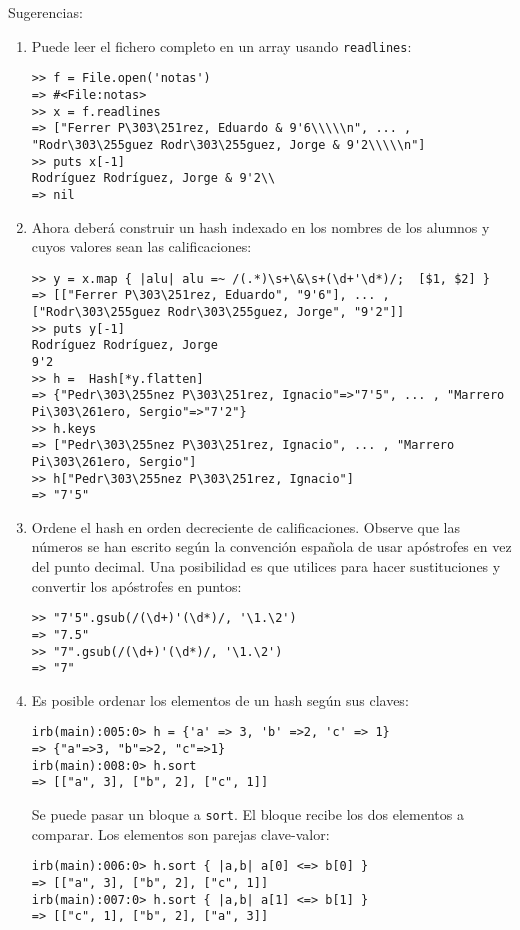 Sugerencias:

\begin{enumerate}
\item
Puede leer el fichero completo en un array usando \verb|readlines|:
\begin{verbatim}
>> f = File.open('notas')
=> #<File:notas>
>> x = f.readlines
=> ["Ferrer P\303\251rez, Eduardo & 9'6\\\\\n", ... , "Rodr\303\255guez Rodr\303\255guez, Jorge & 9'2\\\\\n"]
>> puts x[-1]
Rodríguez Rodríguez, Jorge & 9'2\\
=> nil
\end{verbatim}
\item
Ahora deberá construir un hash indexado
en los nombres de los alumnos y cuyos valores sean las calificaciones:
\begin{verbatim}
>> y = x.map { |alu| alu =~ /(.*)\s+\&\s+(\d+'\d*)/;  [$1, $2] }
=> [["Ferrer P\303\251rez, Eduardo", "9'6"], ... , ["Rodr\303\255guez Rodr\303\255guez, Jorge", "9'2"]]
>> puts y[-1]
Rodríguez Rodríguez, Jorge
9'2
>> h =  Hash[*y.flatten]
=> {"Pedr\303\255nez P\303\251rez, Ignacio"=>"7'5", ... , "Marrero Pi\303\261ero, Sergio"=>"7'2"}
>> h.keys
=> ["Pedr\303\255nez P\303\251rez, Ignacio", ... , "Marrero Pi\303\261ero, Sergio"]
>> h["Pedr\303\255nez P\303\251rez, Ignacio"]
=> "7'5"
\end{verbatim}
\item
Ordene el hash en orden decreciente de calificaciones.
Observe que las números se han escrito según la convención española de usar apóstrofes
en vez del punto decimal. Una posibilidad es que utilices 
para hacer sustituciones
y convertir los apóstrofes en puntos:
\begin{verbatim}
>> "7'5".gsub(/(\d+)'(\d*)/, '\1.\2')
=> "7.5"
>> "7".gsub(/(\d+)'(\d*)/, '\1.\2')
=> "7"
\end{verbatim}
\item
Es posible ordenar los elementos de un hash según sus claves:
\begin{verbatim}
irb(main):005:0> h = {'a' => 3, 'b' =>2, 'c' => 1}
=> {"a"=>3, "b"=>2, "c"=>1}
irb(main):008:0> h.sort
=> [["a", 3], ["b", 2], ["c", 1]]
\end{verbatim}
Se puede pasar un bloque a \verb|sort|. El bloque recibe los dos elementos
a comparar. Los elementos son parejas clave-valor:
\begin{verbatim}
irb(main):006:0> h.sort { |a,b| a[0] <=> b[0] }
=> [["a", 3], ["b", 2], ["c", 1]]
irb(main):007:0> h.sort { |a,b| a[1] <=> b[1] }
=> [["c", 1], ["b", 2], ["a", 3]]
\end{verbatim}
\end{enumerate}


